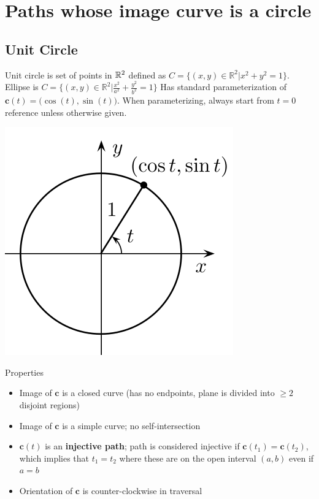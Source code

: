 \section{Paths whose image curve is a circle}

\subsection{Unit Circle}

Unit circle is set of points in $\mathbb{R}^2$ defined as $C=\{(x,y)\in\mathbb{R} ^2|x^2+y^2=1\}$. Ellipse is
$C=\{(x,y)\in\mathbb{R} ^2|\frac{x^2}{a^2}+\frac{y^2}{b^2}=1\}$
Has standard parameterization of $\textbf{c}(t)=\big(\cos(t),\sin(t)\big)$.
When parameterizing, always start from $t=0$ reference unless otherwise given.\newline 

\begin{center}
    \includegraphics[scale=0.3]{figures/unit-circle.png}
\end{center}

\noindent Properties
\begin{itemize}
    \item Image of $\textbf{c}$ is a closed curve (has no endpoints, plane is divided into $\geq 2$ disjoint regions)
    \item Image of $\textbf{c}$ is a simple curve; no self-intersection 
    \item $\textbf{c}(t)$ is an \textbf{injective path}; path is considered injective if $\textbf{c}(t_1)=\textbf{c}(t_2)$, which implies that $t_1=t_2$ where 
    these are on the open interval $(a,b)$ even if $a=b$
    \item Orientation of $\textbf{c}$ is counter-clockwise in traversal
\end{itemize}

